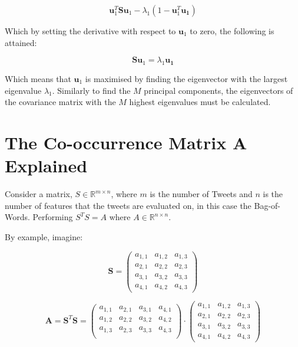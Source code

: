 \documentclass[11pt,a4paper]{article}
\newcommand{\smat}{\mathbf{S}}
\newcommand{\covmat}{\mathbf{A}}
\begin{document}
\begin{equation*}
\mathbf{u}_1^T \mathbf{S} \mathbf{u}_1 - \lambda_1 (1 - \mathbf{u}_1^T \mathbf{u_1})
\label{lagrange_uSu}
\end{equation*} 

Which by setting the derivative with respect to $\mathbf{u}_1$ to zero, the following is attained:


\begin{equation*}
\mathbf{S} \mathbf{u}_1 = \lambda_1  \mathbf{u_1}
\label{eig_uSu}
\end{equation*} 

Which means that $\mathbf{u}_1$ is maximised by finding the eigenvector with the largest eigenvalue $\lambda_1$. Similarly to find the $M$ principal components, the eigenvectors of the covariance matrix with the $M$ highest eigenvalues must be calculated.
\clearpage
\section{The Co-occurrence Matrix $\mathbf{A}$ Explained}
Consider a matrix, $S\in \mathbb{R}^{m\times n}$, where $m$ is the number of Tweets and $n$ is the number of features that the tweets are evaluated on, in this case the Bag-of-Words. Performing $S^TS = A$ where $A \in \mathbb{R}^{n\times n}$. 

By example, imagine:

\begin{equation}
\smat = \left( \begin{matrix}
a_{1, 1} & a_{1, 2} & a_{1, 3} \\ 
a_{2, 1} & a_{2, 2} & a_{2, 3} \\
a_{3, 1} & a_{3, 2} & a_{3, 3} \\
a_{4, 1} & a_{4, 2} & a_{4, 3} 
\end{matrix} \right)
\end{equation}

\begin{equation}
\covmat = \smat^T\smat =
 \left( \begin{matrix}
a_{1, 1} & a_{2, 1} & a_{3, 1} & a_{4, 1} \\ 
a_{1, 2} & a_{2, 2} & a_{3, 2} & a_{4, 2} \\ 
a_{1, 3} & a_{2, 3} & a_{3, 3} & a_{4, 3} \\ 

\end{matrix} \right)
\cdot \left( \begin{matrix}
a_{1, 1} & a_{1, 2} & a_{1, 3} \\ 
a_{2, 1} & a_{2, 2} & a_{2, 3} \\
a_{3, 1} & a_{3, 2} & a_{3, 3} \\
a_{4, 1} & a_{4, 2} & a_{4, 3} 
\end{matrix} \right)
\end{equation}
\end{document}
